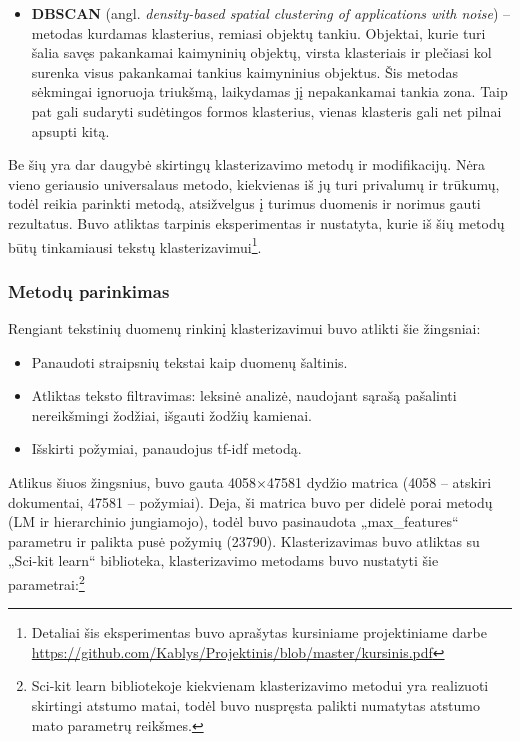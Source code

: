 \documentclass{VUMIFInfBakalaurinis}
\begin{document}
\begin{itemize}
\item
  \textbf{DBSCAN} (angl. \emph{density-based spatial clustering of
  applications with noise}) -- metodas kurdamas klasterius, remiasi
  objektų tankiu. Objektai, kurie turi šalia savęs pakankamai kaimyninių
  objektų, virsta klasteriais ir plečiasi kol surenka visus pakankamai
  tankius kaimyninius objektus. Šis metodas sėkmingai ignoruoja
  triukšmą, laikydamas jį nepakankamai tankia zona. Taip pat gali
  sudaryti sudėtingos formos klasterius, vienas klasteris gali net
  pilnai apsupti kitą.
\end{itemize}

Be šių yra dar daugybė skirtingų klasterizavimo metodų ir modifikacijų.
Nėra vieno geriausio universalaus metodo, kiekvienas iš jų turi
privalumų ir trūkumų, todėl reikia parinkti metodą, atsižvelgus į
turimus duomenis ir norimus gauti rezultatus. Buvo atliktas tarpinis
eksperimentas ir nustatyta, kurie iš šių metodų būtų tinkamiausi tekstų
klasterizavimui\footnote{Detaliai šis eksperimentas buvo aprašytas
  kursiniame projektiniame darbe \url{https://github.com/Kablys/Projektinis/blob/master/kursinis.pdf}}.

\subsubsection{Metodų parinkimas}\label{clustest}

Rengiant tekstinių duomenų rinkinį klasterizavimui buvo atlikti šie
žingsniai:

\begin{itemize}
\item
  Panaudoti straipsnių tekstai kaip duomenų šaltinis.
\item
  Atliktas teksto filtravimas: leksinė analizė, naudojant sąrašą
  pašalinti nereikšmingi žodžiai, išgauti žodžių kamienai.
\item
  Išskirti požymiai, panaudojus tf-idf metodą.
\end{itemize}

Atlikus šiuos žingsnius, buvo gauta 4058×47581 dydžio matrica (4058 --
atskiri dokumentai, 47581 -- požymiai). Deja, ši matrica buvo per didelė
porai metodų (LM ir hierarchinio jungiamojo), todėl buvo pasinaudota
„max\_features“ parametru ir palikta pusė požymių (23790).
Klasterizavimas buvo atliktas su „Sci-kit learn“ biblioteka,
klasterizavimo metodams buvo nustatyti šie parametrai:\footnote{Sci-kit
  learn bibliotekoje kiekvienam klasterizavimo metodui yra realizuoti
  skirtingi atstumo matai, todėl buvo nuspręsta palikti numatytas
  atstumo mato parametrų reikšmes.}
\end{document}
